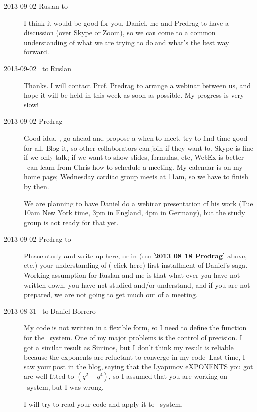 \begin{description}
\item[2013-09-02 Ruslan to \XD]
I think it would be good for you, Daniel,
me and Predrag to have a discussion (over Skype or Zoom), so we can come to a common
understanding of what we are trying to do and what's the best way forward.

\item[2013-09-02 \XD\ to Ruslan] Thanks.
I will contact Prof. Predrag to arrange a webinar
between us, and hope it will be held in this week as soon as possible.
My progress is very slow!

\item[2013-09-02 Predrag] Good idea. \XD, go ahead and propose a
when to meet, try to find time good for all. Blog it, so
other collaborators can join if they want to. Skype is fine if we only talk; if we
want to show slides, formulas, etc, WebEx is better - \XD\ can learn from
Chris how to schedule a meeting. My calendar is on my home page; Wednesday
cardiac group meets at 11am, so we have to finish by then.

We are planning to have Daniel do a webinar presentation of his work
(Tue 10am New York time,
3pm in England, 4pm in Germany), but the study group is not ready for that yet.

\item[2013-09-02 Predrag to \XD]
Please study and write up here, or in  
(see {\bf [2013-08-18 Predrag]} above, etc.) your understanding of
( {click here}) first installment of Daniel's saga.
Working assumption for Ruslan and me is that what ever you have not written
down, you have not studied and/or understand, and if you are not prepared,
we are not going to get much out of a meeting.

\item[2013-08-31 \XD\ to Daniel Borrero]
My code is not written in a flexible form, so I need to define the
function for the \KS\ system. One of my major problems is the control of
precision. I got a similar result as Siminos, but I don't think my result
is reliable because the exponents are reluctant to converge in my code.
Last time, I saw your post in the blog, saying that the Lyapunov
eXPONENTS you got are well fitted to $(q^2-q^4)$, so I assumed that you
are working on \KS\ system, but I was wrong.

I will try to read your code and apply it to \KS\ system.


\end{description}
